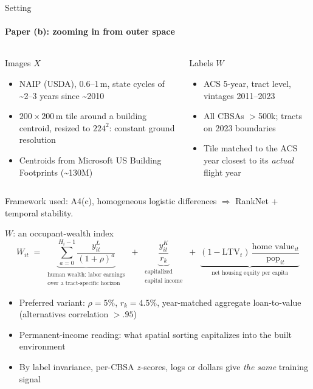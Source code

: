 \documentclass[10pt,aspectratio=169]{beamer}
\begin{document}
\begin{frame}{Setting}
\framesubtitle{Paper (b): zooming in from outer space}
\begin{columns}[T]
\begin{tbox}[blue]{Images $X$}
\footnotesize
\begin{itemize}
  \item NAIP (USDA), 0.6–1\,m, state cycles of \textasciitilde 2–3 years since \textasciitilde 2010
  \item $200\times200$\,m tile around a building centroid, resized to $224^2$: constant ground resolution
  \item Centroids from Microsoft US Building Footprints (\textasciitilde 130M)
\end{itemize}
\end{tbox}
\begin{tbox}[blue]{Labels $W$}
\footnotesize
\begin{itemize}
  \item ACS 5-year, tract level, vintages 2011–2023
  \item All CBSAs $>$500k; tracts on 2023 boundaries
  \item Tile matched to the ACS year closest to its \emph{actual} flight year
\end{itemize}
\end{tbox}
\end{columns}
\small Framework used: A4(c), homogeneous logistic differences $\Rightarrow$ RankNet + temporal stability.
\end{frame}

\begin{frame}{$W$: an occupant-wealth index}
\[
  W_{it} \;=\;
  \underbrace{\sum_{a=0}^{H_{i}-1}\frac{y^{L}_{it}}{(1+\rho)^{a}}}_{\substack{\text{human wealth: labor earnings}\\\text{over a tract-specific horizon}}}
  \;+\;
  \underbrace{\frac{y^{K}_{it}}{r_k}}_{\substack{\text{capitalized}\\\text{capital income}}}
  \;+\;
  \underbrace{(1-\mathrm{LTV}_t)\,\frac{\text{home value}_{it}}{\text{pop}_{it}}}_{\text{net housing equity per capita}}
\]
\begin{itemize}\small
  \item Preferred variant: $\rho=5\%$, $r_k=4.5\%$, year-matched aggregate loan-to-value (alternatives correlation $>.95$)
  \item Permanent-income reading: what spatial sorting capitalizes into the built environment
  \item By label invariance, per-CBSA $z$-scores, logs or dollars give \emph{the same} training signal
\end{itemize}
\end{frame}
\end{document}
